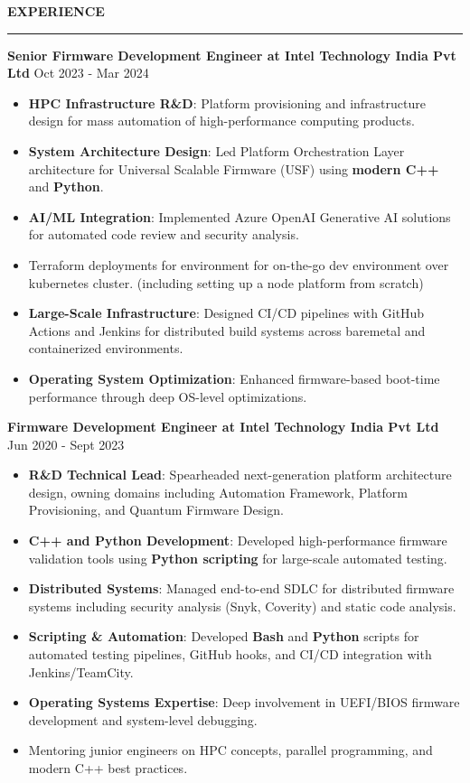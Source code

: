 \documentclass{resume} %
\renewenvironment{rSection}[1]{ %
  \sectionskip
  \textcolor{primaryColor}{\MakeUppercase{\bf #1}} %
  \sectionlineskip
  {\color{primaryColor}\hrule} %
  \begin{list}{}{ %
    \setlength{\leftmargin}{1.5em} %
  }
  \item[]
}{
  \end{list}
}
\begin{document}
\begin{rSection}{Experience}
{\textbf{\textcolor{accentColor}{Senior Firmware Development Engineer at Intel Technology India Pvt Ltd}}}  \hfill {Oct 2023 - Mar 2024}
\begin{itemize}
    \item \textbf{HPC Infrastructure R\&D}: Platform provisioning and infrastructure design for mass automation of high-performance computing products.
    \item \textbf{System Architecture Design}: Led Platform Orchestration Layer architecture for Universal Scalable Firmware (USF) using \textbf{modern C++} and \textbf{Python}.
    \item \textbf{AI/ML Integration}: Implemented Azure OpenAI Generative AI solutions for automated code review and security analysis.
\if{}
    \item Terraform deployments for environment for on-the-go dev environment over kubernetes cluster. (including setting up a node platform from scratch)
\fi
    \item \textbf{Large-Scale Infrastructure}: Designed CI/CD pipelines with GitHub Actions and Jenkins for distributed build systems across baremetal and containerized environments.
    \item \textbf{Operating System Optimization}: Enhanced firmware-based boot-time performance through deep OS-level optimizations.
\end{itemize}
 
{\textbf{\textcolor{accentColor}{Firmware Development Engineer at Intel Technology India Pvt Ltd}}}  \hfill {Jun 2020 - Sept 2023}
\begin{itemize}
    \item \textbf{R\&D Technical Lead}: Spearheaded next-generation platform architecture design, owning domains including Automation Framework, Platform Provisioning, and Quantum Firmware Design.
    \item \textbf{C++ and Python Development}: Developed high-performance firmware validation tools using \textbf{Python scripting} for large-scale automated testing.
    \item \textbf{Distributed Systems}: Managed end-to-end SDLC for distributed firmware systems including security analysis (Snyk, Coverity) and static code analysis.
    \item \textbf{Scripting \& Automation}: Developed \textbf{Bash} and \textbf{Python} scripts for automated testing pipelines, GitHub hooks, and CI/CD integration with Jenkins/TeamCity.
    \item \textbf{Operating Systems Expertise}: Deep involvement in UEFI/BIOS firmware development and system-level debugging.
    \item Mentoring junior engineers on HPC concepts, parallel programming, and modern C++ best practices.
\end{itemize}


\end{rSection}
\end{document}
